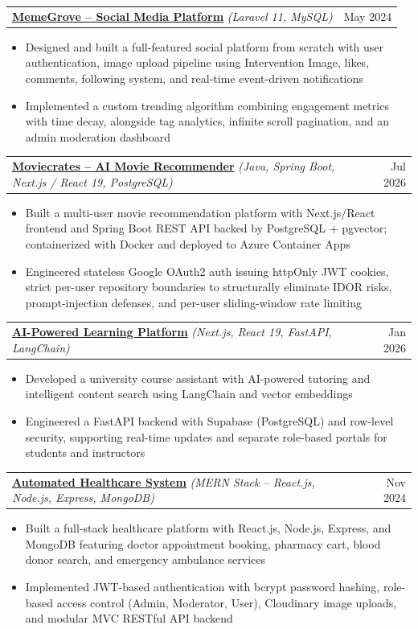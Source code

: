 \documentclass[letterpaper,10.5pt]{article}
\makeatletter
\newcommand{\resumeItem}[1]{%
  \item\small{#1}\par\vspace{-2pt}%
}
\newcommand{\resumeProjectHeading}[2]{
    \item
    \begin{tabular*}{\textwidth}{l@{\extracolsep{\fill}}r}
      \small#1 & #2 \\
    \end{tabular*}\vspace{-7pt}
}
\newcommand{\resumeItemListStart}{\begin{itemize}[leftmargin=0.15in]}
\newcommand{\resumeItemListEnd}{\end{itemize}\vspace{-5pt}}
\makeatother
\begin{document}
      \resumeProjectHeading
          {\textbf{\href{https://github.com/Apn7/Laravel_Project}{\underline{MemeGrove -- Social Media Platform}}} \textit{(Laravel 11, MySQL)}}{May 2024}
          \resumeItemListStart
            \resumeItem{Designed and built a full-featured social platform from scratch with user authentication, image upload pipeline using Intervention Image, likes, comments, following system, and real-time event-driven notifications}
            \resumeItem{Implemented a custom trending algorithm combining engagement metrics with time decay, alongside tag analytics, infinite scroll pagination, and an admin moderation dashboard}
          \resumeItemListEnd

      \resumeProjectHeading
          {\textbf{\href{https://github.com/Apn7/Moviecrates}{\underline{Moviecrates -- AI Movie Recommender}}} \textit{(Java, Spring Boot, Next.js / React 19, PostgreSQL)}}{Jul 2026}
          \resumeItemListStart
            \resumeItem{Built a multi-user movie recommendation platform with Next.js/React frontend and Spring Boot REST API backed by PostgreSQL + pgvector; containerized with Docker and deployed to Azure Container Apps}
            \resumeItem{Engineered stateless Google OAuth2 auth issuing httpOnly JWT cookies, strict per-user repository boundaries to structurally eliminate IDOR risks, prompt-injection defenses, and per-user sliding-window rate limiting}
          \resumeItemListEnd

      \resumeProjectHeading
          {\textbf{\href{https://github.com/Apn7/Hackathon_Final}{\underline{AI-Powered Learning Platform}}} \textit{(Next.js, React 19, FastAPI, LangChain)}}{Jan 2026}
          \resumeItemListStart
            \resumeItem{Developed a university course assistant with AI-powered tutoring and intelligent content search using LangChain and vector embeddings}
            \resumeItem{Engineered a FastAPI backend with Supabase (PostgreSQL) and row-level security, supporting real-time updates and separate role-based portals for students and instructors}
          \resumeItemListEnd

      \resumeProjectHeading
          {\textbf{\href{https://github.com/Apn7/System_Project}{\underline{Automated Healthcare System}}} \textit{(MERN Stack -- React.js, Node.js, Express, MongoDB)}}{Nov 2024}
          \resumeItemListStart
            \resumeItem{Built a full-stack healthcare platform with React.js, Node.js, Express, and MongoDB featuring doctor appointment booking, pharmacy cart, blood donor search, and emergency ambulance services}
            \resumeItem{Implemented JWT-based authentication with bcrypt password hashing, role-based access control (Admin, Moderator, User), Cloudinary image uploads, and modular MVC RESTful API backend}
          \resumeItemListEnd
\end{document}
